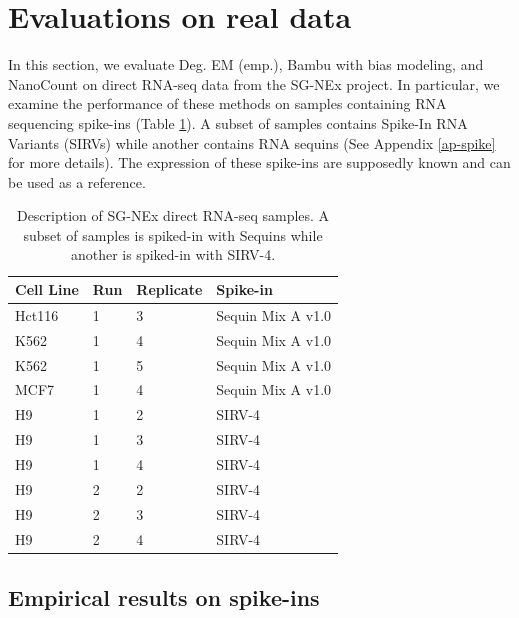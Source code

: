 \section{Evaluations on real data}

In this section, we evaluate Deg. EM (emp.), Bambu with bias modeling, and NanoCount on direct RNA-seq data from the SG-NEx project. In particular, we examine the performance of these methods on samples containing RNA sequencing spike-ins (Table \ref{tab-sgnex}). A subset of samples contains Spike-In RNA Variants (SIRVs) \cite{Lexogen20201} while another contains RNA sequins \cite{Sequins} (See Appendix \ref{ap-spike} for more details). The expression of these spike-ins are supposedly known and can be used as a reference.   

\begin{table}[htbp]
  \centering
    \begin{tabular}{|p{2cm}|p{2cm}|p{2cm}|p{3.5cm}|}
    \hline
    Cell Line & Run & Replicate   & Spike-in \bigstrut\\
    \hline
    Hct116 & 1     & 3     & Sequin Mix A v1.0 \bigstrut\\
    \hline
    K562  & 1     & 4     & Sequin Mix A v1.0 \bigstrut\\
    \hline
    K562  & 1     & 5   & Sequin Mix A v1.0 \bigstrut\\
    \hline
    MCF7  & 1     & 4     & Sequin Mix A v1.0 \bigstrut\\
    \hline
    H9    & 1     & 2     & SIRV-4 \bigstrut\\
    \hline
    H9    & 1     & 3     & SIRV-4 \bigstrut\\
    \hline
    H9    & 1     & 4     & SIRV-4 \bigstrut\\
    \hline
    H9    & 2     & 2     & SIRV-4 \bigstrut\\
    \hline
    H9    & 2     & 3     & SIRV-4 \bigstrut\\
    \hline
    H9    & 2     & 4     & SIRV-4 \bigstrut\\
    \hline
    \end{tabular}%
  \caption[Description of SG-NEx direct RNA-seq samples.]{Description of SG-NEx direct RNA-seq samples. A subset of samples is spiked-in with Sequins while another is spiked-in with SIRV-4.}
  \label{tab-sgnex}
\end{table}%

\subsection{Empirical results on spike-ins}

